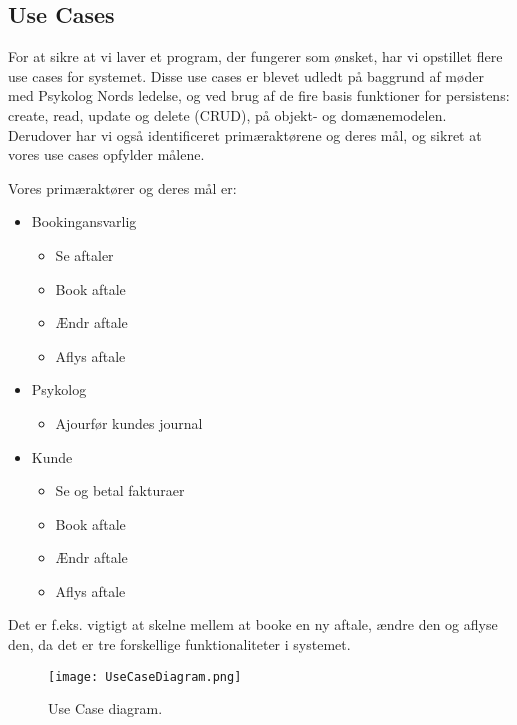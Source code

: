 \subsection{Use Cases}
\label{UseCases}
For at sikre at vi laver et program, der fungerer som ønsket, har vi opstillet flere use cases for systemet.
Disse use cases er blevet udledt på baggrund af møder med Psykolog Nords ledelse, og ved brug af de fire basis funktioner for persistens: create, read, update og delete (CRUD), på objekt- og domænemodelen.
Derudover har vi også identificeret primæraktørene og deres mål, og sikret at vores use cases opfylder målene.

Vores primæraktører og deres mål er:

\begin{itemize}
    \item Bookingansvarlig
        \begin{itemize}
            \item Se aftaler
            \item Book aftale
            \item Ændr aftale
            \item Aflys aftale
        \end{itemize}
    \item Psykolog
        \begin{itemize}
            \item Ajourfør kundes journal
        \end{itemize}
    \item Kunde
        \begin{itemize}
            \item Se og betal fakturaer
            \item Book aftale
            \item Ændr aftale
            \item Aflys aftale
        \end{itemize}

\end{itemize}

Det er f.eks. vigtigt at skelne mellem at booke en ny aftale, ændre den og aflyse den, da det er tre forskellige funktionaliteter i systemet.

\begin{figure}[ht]
	\centering
  		\texttt{[image: UseCaseDiagram.png]}
  \caption{Use Case diagram.}
  \label{fig:UseCaseDiagram}
\end{figure}

